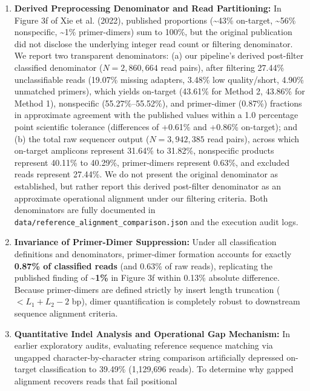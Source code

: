 \documentclass[
]{article}
\providecommand{\tightlist}{%
  \setlength{\itemsep}{0pt}\setlength{\parskip}{0pt}}
\begin{document}
\begin{enumerate}
\def\labelenumi{\arabic{enumi}.}
\tightlist
\item
  \textbf{Derived Preprocessing Denominator and Read Partitioning:} In
  Figure 3f of Xie et al. (2022), published proportions
  (\textasciitilde43\% on-target, \textasciitilde56\% nonspecific,
  \textasciitilde1\% primer-dimers) sum to 100\%, but the original
  publication did not disclose the underlying integer read count or
  filtering denominator. We report two transparent denominators: (a) our
  pipeline's derived post-filter classified denominator
  (\(N = 2,860,664\) read pairs), after filtering 27.44\% unclassifiable
  reads (19.07\% missing adapters, 3.48\% low quality/short, 4.90\%
  unmatched primers), which yields on-target (43.61\% for Method 2,
  43.86\% for Method 1), nonspecific (55.27\%--55.52\%), and
  primer-dimer (0.87\%) fractions in approximate agreement with the
  published values within a 1.0 percentage point scientific tolerance
  (differences of +0.61\% and +0.86\% on-target); and (b) the total raw
  sequencer output (\(N = 3,942,385\) read pairs), across which
  on-target amplicons represent 31.64\% to 31.82\%, nonspecific products
  represent 40.11\% to 40.29\%, primer-dimers represent 0.63\%, and
  excluded reads represent 27.44\%. We do not present the original
  denominator as established, but rather report this derived post-filter
  denominator as an approximate operational alignment under our
  filtering criteria. Both denominators are fully documented in
  \texttt{data/reference\_alignment\_comparison.json} and the execution
  audit logs.
\item
  \textbf{Invariance of Primer-Dimer Suppression:} Under all
  classification definitions and denominators, primer-dimer formation
  accounts for exactly \textbf{0.87\% of classified reads} (and 0.63\%
  of raw reads), replicating the published finding of
  \textbf{\textasciitilde1\%} in Figure 3f within 0.13\% absolute
  difference. Because primer-dimers are defined strictly by insert
  length truncation (\(< L_1 + L_2 - 2\) bp), dimer quantification is
  completely robust to downstream sequence alignment criteria.
\item
  \textbf{Quantitative Indel Analysis and Operational Gap Mechanism:} In
  earlier exploratory audits, evaluating reference sequence matching via
  ungapped character-by-character string comparison artificially
  depressed on-target classification to 39.49\% (1,129,696 reads). To
  determine why gapped alignment recovers reads that fail positional

\end{enumerate}
\end{document}
